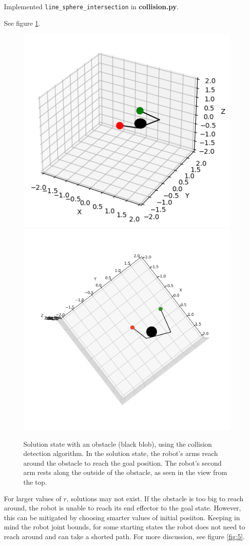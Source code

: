 \documentclass{article}
\begin{document}
    \begin{problem}
        Implemented \texttt{line\_sphere\_intersection} in \textbf{collision.py}.
    \end{problem}

    \begin{problem}
        See figure \ref{fig:ik-b}.
    \end{problem}

    \begin{figure}[p]
        \centering
        \includegraphics[width=0.45\linewidth]{ik-b_solution.png}
        \includegraphics[width=0.45\linewidth]{ik-b2.png}
        \caption{Solution state with an obstacle (black blob), using the collision detection algorithm. In the solution state, the robot's arms reach around the obstacle to reach the goal position. The robot's second arm rests along the outside of the obstacle, as seen in the view from the top.}
        \label{fig:ik-b}
    \end{figure}

    \begin{problem}
        For larger values of $r$, solutions may not exist. If the obstacle is too big to reach around, the robot is unable to reach its end effector to the goal state. However, this can be mitigated by choosing smarter values of initial posiiton. Keeping in mind the robot joint bounds, for some starting states the robot does not need to reach around and can take a shorted path.
        For more discussion, see figure \ref{fig:5}.
    \end{problem}
\end{document}
